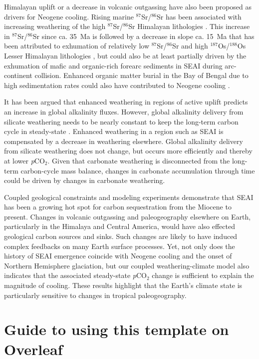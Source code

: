 \documentclass[9pt,twocolumn,twoside,lineno]{pnas-new}
\newcommand{\SrSr}{$^{87}$Sr/$^{86}$Sr\xspace}
\newcommand{\OsOs}{$^{187}$Os/$^{188}$Os\xspace}
\newcommand{\pCOtwo}{\textit{p}CO$_{2}$\xspace}
\begin{document}
Himalayan uplift \cite{Raymo1992a, Galy2007a} or a decrease in volcanic outgassing \cite{Berner1983a} have also been proposed as drivers for Neogene cooling. Rising marine \SrSr has been associated with increasing weathering of the high \SrSr Himalayan lithologies \cite{Raymo1992a}. This increase in \SrSr since ca. 35~Ma is followed by a decrease in slope ca. 15~Ma that has been attributed to exhumation of relatively low \SrSr and high \OsOs Lesser Himalayan lithologies \cite{Colleps2018a}, but could also be at least partially driven by the exhumation of mafic and organic-rich forearc sediments in SEAI during arc-continent collision. Enhanced organic matter burial in the Bay of Bengal due to high sedimentation rates could also have contributed to Neogene cooling \cite{Galy2007a}.

It has been argued that enhanced weathering in regions of active uplift predicts an increase in global alkalinity fluxes. However, global alkalinity delivery from silicate weathering needs to be nearly constant to keep the long-term carbon cycle in steady-state \cite{Kump1997a}. Enhanced weathering in a region such as SEAI is compensated by a decrease in weathering elsewhere. Global alkalinity delivery from silicate weathering does not change, but occurs more efficiently and thereby at lower \pCOtwo. Given that carbonate weathering is disconnected from the long-term carbon-cycle mass balance, changes in carbonate accumulation through time \cite{Si2019a} could be driven by changes in carbonate weathering.

Coupled geological constraints and modeling experiments demonstrate that SEAI has been a growing hot spot for carbon sequestration from the Miocene to present. Changes in volcanic outgassing and paleogeography elsewhere on Earth, particularly in the Himalaya and Central America, would have also effected geological carbon sources and sinks. Such changes are likely to have induced complex feedbacks on many Earth surface processes. Yet, not only does the history of SEAI emergence coincide with Neogene cooling and the onset of Northern Hemisphere glaciation, but our coupled weathering-climate model also indicates that the associated steady-state \pCOtwo change is sufficient to explain the magnitude of cooling. These results highlight that the Earth's climate state is particularly sensitive to changes in tropical paleogeography.

\section*{Guide to using this template on Overleaf}
\end{document}
